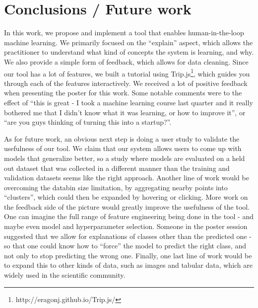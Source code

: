 \documentclass{chi2009}
\begin{document}
\section{Conclusions / Future work}
In this work, we propose and implement a tool that enables human-in-the-loop
machine learning. We primarily focused on the ``explain'' aspect, which allows
the practitioner to understand what kind of concepts the system is learning, and
why. We also provide a simple form of feedback, which allows for data cleaning.
Since our tool has a lot of features, we built a tutorial using
Trip.js\footnote{http://eragonj.github.io/Trip.js/}, which guides you through
each of the features interactively.
We received a lot of positive feedback when presenting the poster for this work.
Some notable comments were to the effect of ``this is great - I took a machine
learning course last quarter and it really bothered me that I didn't know what
it was learning, or how to improve it'', or ``are you guys thinking of turning
this into a startup?''.

As for future work, an obvious next step is doing a user study to validate the
usefulness of our tool. We claim that our system allows users to come up with
models that generalize better, so a study where models are evaluated on a held
out dataset that was collected in a different manner than the training and
validation datasets seems like the right approach. Another line of work would be
overcoming the databin size limitation, by aggregating nearby points into
``clusters'', which could then be expanded by hovering or clicking. More work on
the feedback side of the picture would greatly improve the usefulness of the
tool. One can imagine the full range of feature engineering being done in the
tool - and maybe even model and hyperparameter selection. Someone in the poster
session suggested that we allow for explanations of classes other than the
predicted one - so that one could know how to ``force'' the model to predict the
right class, and not only to stop predicting the wrong one. Finally, one last
line of work would be to expand this to other kinds of data, such as images and
tabular data, which are widely used in the scientific community.




\end{document}
